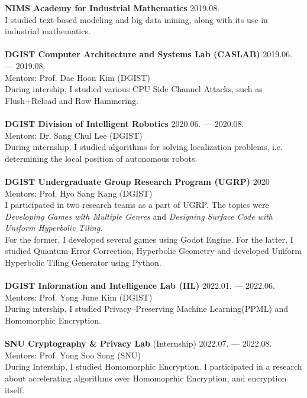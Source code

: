 \textbf{NIMS Academy for Industrial Mathematics} \hfill 2019.08. \\
I studied text-based modeling and big data mining, along with its use in industrial mathematics. \\
\\
\textbf{DGIST Computer Architecture and Systems Lab (CASLAB)} \hfill 2019.06. --- 2019.08. \\
Mentors: Prof. Dae Hoon Kim (DGIST)  \\
During intership, I studied various CPU Side Channel Attacks, such as Flush+Reload and Row Hammering. \\
\\
\textbf{DGIST Division of Intelligent Robotics} \hfill 2020.06. --- 2020.08. \\
Mentors: Dr. Sang Chul Lee (DGIST) \\
During internship, I studied algorithms for solving localization problems, i.e. determining the local position of autonomous robots. \\
\\
\textbf{DGIST Undergraduate Group Research Program (UGRP)}  \hfill 2020\\
Mentors: Prof. Hyo Sang Kang (DGIST) \\
I participated in two research teams as a part of UGRP. The topics were \textit{Developing Games with Multiple Genres} and \textit{Designing Surface Code with Uniform Hyperbolic Tiling}.  \\
For the former, I developed several games using Godot Engine. For the latter, I studied Quantum Error Correction, Hyperbolic Geometry and developed Uniform Hyperbolic Tiling Generator using Python. \\
\\
\textbf{DGIST Information and Intelligence Lab (IIL)}  \hfill 2022.01. --- 2022.06. \\
Mentors: Prof. Yong June Kim (DGIST) \\
During intership, I studied Privacy--Preserving Machine Learning(PPML) and Homomorphic Encryption. \\
\\
\textbf{SNU Cryptography \& Privacy Lab} (Internship) \hfill 2022.07. --- 2022.08. \\
Mentors: Prof. Yong Soo Song (SNU) \\
During Intership, I studied Homomorphic Encryption. I participated in a research about accelerating algorithms over Homomoprhic Encryption, and encryption itself. \\

